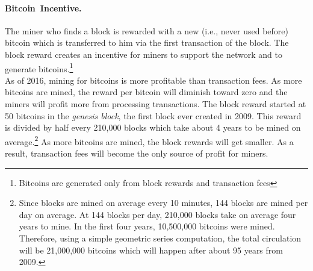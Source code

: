 \documentclass[11pt]{article}
\theoremstyle{mytheoremstyle}
\begin{document}
\paragraph{Bitcoin~Incentive.} The miner who finds a block is rewarded with
a new (i.e., never used before) bitcoin which is transferred to him
via the first transaction of the block. The block reward creates an
incentive for miners to support the network and to generate bitcoins.\footnote{Bitcoins are generated only from block rewards and transaction fees}\\
As of 2016, mining for bitcoins is more profitable than transaction
fees. As more bitcoins are mined, the reward per bitcoin will diminish
toward zero and the miners will profit more from processing transactions.
The block reward started at 50 bitcoins in the \emph{genesis block},
the first block ever created in 2009. This reward is divided by half
every 210,000 blocks which take about 4 years to be mined on average.\footnote{Since blocks are mined on average every 10 minutes, 144 blocks are
	mined per day on average. At 144 blocks per day, 210,000 blocks take
	on average four years to mine. In the first four years, 10,500,000
	bitcoins were mined. Therefore, using a simple geometric series computation,
	the total circulation will be 21,000,000 bitcoins which will happen
	after about 95 years from 2009. } As more bitcoins are mined, the block rewards will get smaller. As
a result, transaction fees will become the only source of profit for
miners.


\end{document}
